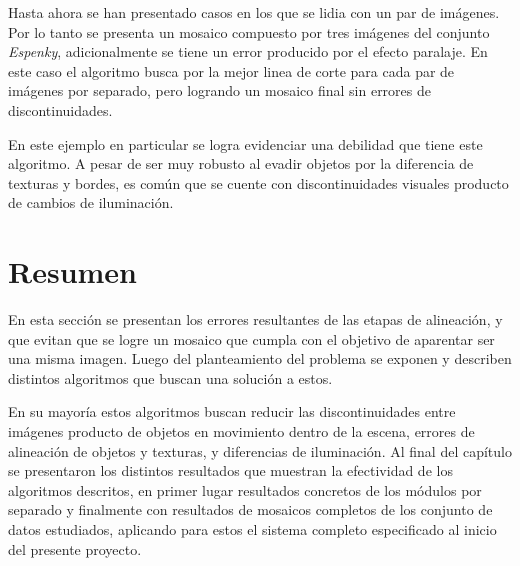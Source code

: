 Hasta ahora se han presentado casos en los que se lidia con un par de imágenes. Por lo tanto se presenta un mosaico compuesto por tres imágenes del conjunto \textit{Espenky}, adicionalmente se tiene un error producido por el efecto paralaje. En este caso el algoritmo busca por la mejor linea de corte para cada par de imágenes por separado, pero logrando un mosaico final sin errores de discontinuidades.

En este ejemplo en particular se logra evidenciar una debilidad que tiene este algoritmo. A pesar de ser muy robusto al evadir objetos por la diferencia de texturas y bordes, es común que se cuente con discontinuidades visuales producto de cambios de iluminación.


\section{Resumen}

En esta sección se presentan los errores resultantes de las etapas de alineación, y que evitan que se logre un  mosaico que cumpla con el objetivo de aparentar ser una misma imagen. Luego del planteamiento del problema se exponen y describen distintos algoritmos que buscan una solución a estos.

En su mayoría estos algoritmos buscan reducir las discontinuidades entre imágenes producto de objetos en movimiento dentro de la escena, errores de alineación de objetos y texturas, y diferencias de iluminación. Al final del capítulo se presentaron los distintos resultados que muestran la efectividad de los algoritmos descritos, en primer lugar resultados concretos de los módulos por separado y finalmente con resultados de mosaicos completos de los conjunto de datos estudiados, aplicando para estos el sistema completo especificado al inicio del presente proyecto.

